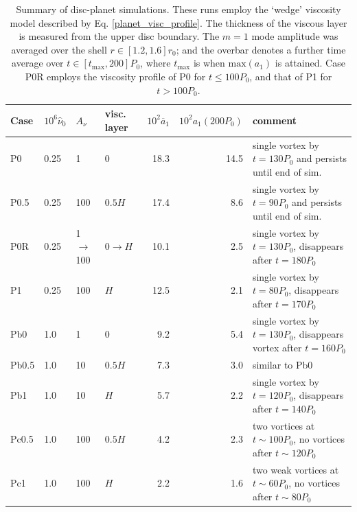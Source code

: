 \begin{table}
  \centering
  \caption{Summary of disc-planet simulations. These runs employ the
    `wedge' viscosity model described by
    Eq. \ref{planet_visc_profile}. The thickness of the viscous layer
    is measured from the upper disc boundary. The $m=1$ mode amplitude was 
    averaged over the shell $r\in[1.2,1.6]r_0$; and the overbar
    denotes a further time average over    
    $t\in[t_\mathrm{max},200]P_0$, where $t_\mathrm{max}$ is when
    $\mathrm{max}(a_1)$ is attained. Case P0R employs the
    viscosity profile of P0 for $t\leq100P_0$, and that of P1 for 
    $t>100P_0$.\label{planet_sims}}
    \begin{tabular}{llllrrl}
      \hline\hline
      Case & $10^6\hat{\nu}_0$ & $A_\nu$ & visc. layer&
      $10^2\overline{a}_1$&$10^2a_1(200P_0)$ & comment \\ 
      \hline
      P0     & 0.25  & 1            & 0     & 18.3  & 14.5 & single vortex
       by $t=130P_0$ and persists until end of sim.  \\ %
      P0.5   & 0.25  & 100          & $0.5H$ &  17.4  & 8.6& single vortex
      by $t=90P_0$ and persists until end of sim.\\ 
      P0R    & 0.25  & 1$\to$100    & $0\to H$& 10.1 & 2.5& single vortex
      by $t=130P_0$, disappears after $t=180P_0$ \\
      P1     & 0.25  & 100          & $H$    & 12.5  & 2.1 &single vortex
      by $t=80P_0$, disappears after $t=170P_0$ \\   %
      

      Pb0     & 1.0  & 1          & 0      & 9.2  & 5.4 &single vortex by $t=130P_0$, disappears
      vortex after $t=160P_0$   \\ %
      Pb0.5   & 1.0  & 10         & $0.5H$ & 7.3  & 3.0 &similar to Pb0     \\ 
      Pb1     & 1.0  & 10         & $H$    & 5.7  & 2.2   &single vortex
      by $t=120P_0$, disappears after $t=140P_0$   \\ %

      Pc0.5   & 1.0  & 100          & $0.5H$ & 4.2  &  2.3 &two vortices
      at $t\sim100P_0$, no vortices after $t\sim120P_0$   \\ %
      Pc1     & 1.0  & 100          & $H$    & 2.2 &  1.6 &two weak vortices at
      $t\sim60P_0$, no vortices after $t\sim 80P_0$\\ %
      \hline
  \end{tabular}
\end{table}

